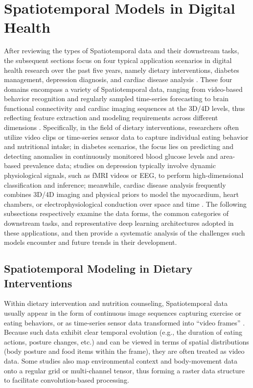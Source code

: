 \documentclass[acmsmall]{acmart}
\begin{document}
\section{Spatiotemporal Models in Digital Health}
\label{sec:models}
After reviewing the types of Spatiotemporal data and their downstream tasks, the subsequent sections focus on four typical application scenarios in digital health research over the past five years, namely dietary interventions, diabetes management, depression diagnosis, and cardiac disease analysis \cite{2,3,5,8}. These four domains encompass a variety of Spatiotemporal data, ranging from video-based behavior recognition and regularly sampled time-series forecasting to brain functional connectivity and cardiac imaging sequences at the 3D/4D levels, thus reflecting feature extraction and modeling requirements across different dimensions \cite{9,4}. Specifically, in the field of dietary interventions, researchers often utilize video clips or time-series sensor data to capture individual eating behavior and nutritional intake; in diabetes scenarios, the focus lies on predicting and detecting anomalies in continuously monitored blood glucose levels and area-based prevalence data; studies on depression typically involve dynamic physiological signals, such as fMRI videos or EEG, to perform high-dimensional classification and inference; meanwhile, cardiac disease analysis frequently combines 3D/4D imaging and physical priors to model the myocardium, heart chambers, or electrophysiological conduction over space and time \cite{2,5,7}. The following subsections respectively examine the data forms, the common categories of downstream tasks, and representative deep learning architectures adopted in these applications, and then provide a systematic analysis of the challenges such models encounter and future trends in their development.

\subsection{Spatiotemporal Modeling in Dietary Interventions}
Within dietary intervention and nutrition counseling, Spatiotemporal data usually appear in the form of continuous image sequences capturing exercise or eating behaviors, or as time-series sensor data transformed into ``video frames'' \cite{9}. Because such data exhibit clear temporal evolution (e.g., the duration of eating actions, posture changes, etc.) and can be viewed in terms of spatial distributions (body posture and food items within the frame), they are often treated as video data. Some studies also map environmental context and body-movement data onto a regular grid or multi-channel tensor, thus forming a raster data structure to facilitate convolution-based processing.
\end{document}
